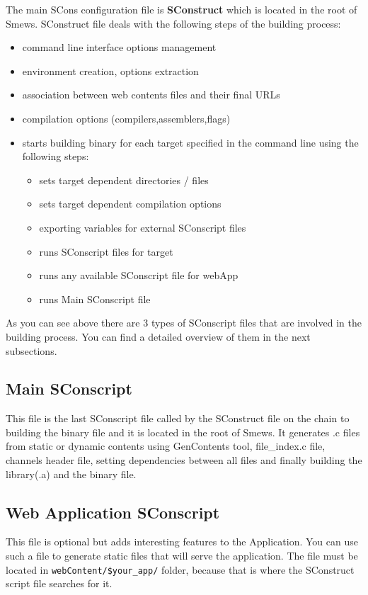 \documentclass{report}
\begin{document}
The main SCons configuration file is \textbf{SConstruct} which is located in the root of Smews.
SConstruct file deals with the following steps of the building process:
\begin{itemize}
\item command line interface options management
\item environment creation, options extraction
\item association between web contents files and their final URLs
\item compilation options (compilers,assemblers,flags)
\item starts building binary for each target specified in the command line using the following steps:
	\begin{itemize}
	\item sets target dependent directories / files
	\item sets target dependent compilation options
	\item exporting variables for external SConscript files
	\item runs SConscript files for target
	\item runs any available SConscript file for webApp
	\item runs Main SConscript file
	\end{itemize}
\end{itemize}

As you can see above there are 3 types of SConscript files that are involved in the building process. You can find a detailed overview of them in the next subsections.

\subsection{Main SConscript}

This file is the last SConscript file called by the SConstruct file on the chain to building the binary file and it is located in the root of Smews. It generates .c files from static or dynamic contents using GenContents tool, file\_index.c file, channels header file, setting dependencies between all files and finally building the library(.a) and the binary file.

\subsection{Web Application SConscript}

This file is optional but adds interesting features to the Application. You can use such a file to generate static files that will serve the application. The file must be located in \texttt{webContent/\$your\_app/} folder, because that is where the SConstruct script file searches for it.
\end{document}
